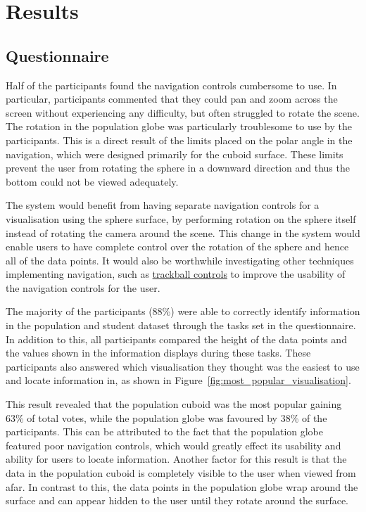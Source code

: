 \section{Results} {
\label{sec:results}

	\subsection{Questionnaire} {
	\label{sec:questionnaire}

		Half of the participants found the navigation controls cumbersome to use. In particular, participants commented that they could pan and zoom across the screen without experiencing any difficulty, but often struggled to rotate the scene. The rotation in the population globe was particularly troublesome to use by the participants. This is a direct result of the limits placed on the polar angle in the navigation, which were designed primarily for the cuboid surface. These limits prevent the user from rotating the sphere in a downward direction and thus the bottom could not be viewed adequately. 

		The system would benefit from having separate navigation controls for a visualisation using the sphere surface, by performing rotation on the sphere itself instead of rotating the camera around the scene. This change in the system would enable users to have complete control over the rotation of the sphere and hence all of the data points. It would also be worthwhile investigating other techniques implementing navigation, such as \href{http://threejs.org/examples/misc_controls_trackball.html}{trackball controls} to improve the usability of the navigation controls for the user.

		The majority of the participants (88\%) were able to correctly identify information in the population and student dataset through the tasks set in the questionnaire. In addition to this, all participants compared the height of the data points and the values shown in the information displays during these tasks. These participants also answered which visualisation they thought was the easiest to use and locate information in, as shown in Figure~\ref{fig:most_popular_visualisation}. 

		

		This result revealed that the population cuboid was the most popular gaining 63\% of total votes, while the population globe was favoured by 38\% of the participants. This can be attributed to the fact that the population globe featured poor navigation controls, which would greatly effect its usability and ability for users to locate information. Another factor for this result is that the data in the population cuboid is completely visible to the user when viewed from afar. In contrast to this, the data points in the population globe wrap around the surface and can appear hidden to the user until they rotate around the surface. 

}}
